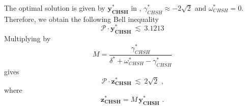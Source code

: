 The optimal solution is given by $\mathbf{y^*_{CHSH}}$ in ,
$\gamma^*_{CHSH} \approx - 2 \sqrt{2}$ and $\omega^*_{CHSH} =0$. \\
Therefore, we obtain the following Bell inequality
\begin{equation}
    \mathcal{P} \cdot \mathbf{y^*_{CHSH}} \ \lesssim\ 3.1213 
    \label{eq:chsh_ineq1}
\end{equation}
Multiplying  by 
 \begin{equation*}
     M = \dfrac{\gamma^*_{CHSH}}{\delta^* + \omega^*_{CHSH} - \gamma^*_{CHSH}}  
\end{equation*}
gives
\begin{equation}
    \mathcal{P} \cdot \mathbf{z^*_{CHSH}} \ \lesssim\ 2 \sqrt{2} \text{ ,}
\end{equation}
where 
\begin{equation*}
\mathbf{z^*_{CHSH}} = M \, \mathbf{y^*_{CHSH}} \text{ .}
\end{equation*}



